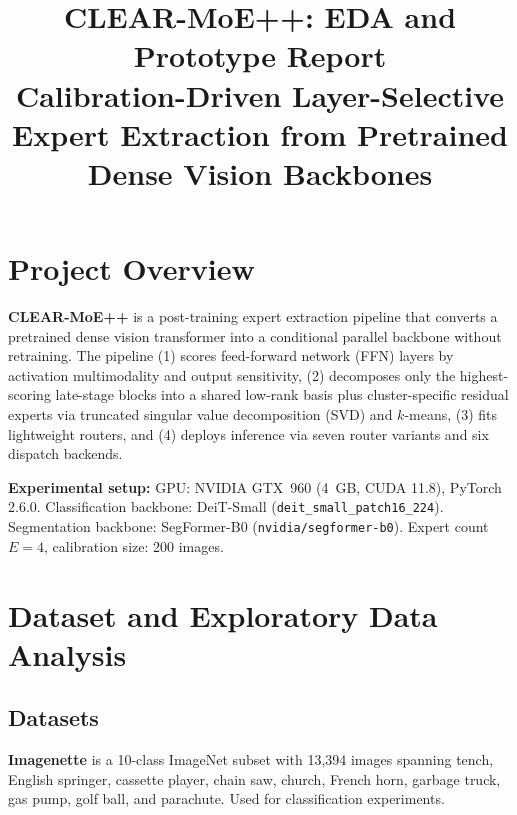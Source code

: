 \documentclass[conference]{IEEEtran}
\begin{document}
\title{CLEAR-MoE++: EDA and Prototype Report\\
{\normalsize Calibration-Driven Layer-Selective Expert Extraction
from Pretrained Dense Vision Backbones}}

\author{
}

\maketitle

\section{Project Overview}
\label{sec:overview}

\textbf{CLEAR-MoE++} is a post-training expert extraction pipeline that
converts a pretrained dense vision transformer into a conditional parallel
backbone without retraining.
The pipeline (1) scores feed-forward network (FFN) layers by activation
multimodality and output sensitivity, (2) decomposes only the
highest-scoring late-stage blocks into a shared low-rank basis plus
cluster-specific residual experts via truncated singular value
decomposition (SVD) and $k$-means, (3) fits lightweight routers, and
(4) deploys inference via seven router variants and six dispatch backends.

\textbf{Experimental setup:}
GPU: NVIDIA GTX~960 (4~GB, CUDA 11.8), PyTorch 2.6.0.
Classification backbone: DeiT-Small (\texttt{deit\_small\_patch16\_224}).
Segmentation backbone: SegFormer-B0 (\texttt{nvidia/segformer-b0}).
Expert count $E=4$, calibration size: 200 images.

\section{Dataset and Exploratory Data Analysis}
\label{sec:eda}

\subsection{Datasets}

\textbf{Imagenette} is a 10-class ImageNet subset with 13,394 images
spanning tench, English springer, cassette player, chain saw, church,
French horn, garbage truck, gas pump, golf ball, and parachute.
Used for classification experiments.
\end{document}
